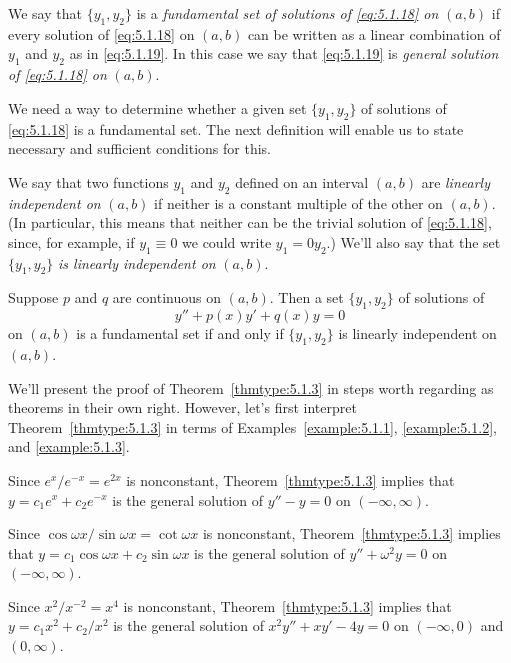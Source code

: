 We say that $\{y_{1},y_{2}\}$ is a {\color{blue}\it fundamental set of solutions of
\eqref{eq:5.1.18} on \/} $(a,b)$ if every solution of \eqref{eq:5.1.18} on $(a,b)$ can be written
as a linear combination of $y_{1}$ and $y_{2}$ as in \eqref{eq:5.1.19}. In this case we say that
\eqref{eq:5.1.19} is {\color{blue}\it general solution of \eqref{eq:5.1.18} on\/} $(a,b)$.


\noindent
We need a way to determine whether a given set $\{y_{1},y_{2}\}$ of solutions of \eqref{eq:5.1.18}
is a fundamental set. The next definition will enable us to state necessary and sufficient
conditions for this.

We say that two functions $y_{1}$ and $y_{2}$ defined on an interval $(a,b)$ are {\color{blue}\it
linearly independent on\/} $(a,b)$ if neither is a constant multiple of the other on $(a,b)$. (In
particular, this means that neither can be the trivial solution of \eqref{eq:5.1.18}, since, for
example, if $y_{1}\equiv0$ we could write $y_{1}=0y_{2}$.) We'll also say that the set
$\{y_{1},y_{2}\}$ {\color{blue}\it is linearly independent on\/} $(a,b)$.

\begin{theorem}
  \color{blue}
  \label{thmtype:5.1.3} Suppose $p$ and $q$ are continuous on $(a,b)$. Then a set $\{y_{1},y_{2}\}$
  of solutions of
  \begin{equation}
    \label{eq:5.1.20}y''+p(x)y'+q(x)y=0
  \end{equation}
  on $(a,b)$ is a fundamental set if and only if $\{y_{1},y_{2}\}$ is linearly independent on
  $(a,b)$.
\end{theorem}

We'll present the proof of Theorem~\ref{thmtype:5.1.3} in steps worth regarding as theorems in their
own right. However, let's first interpret Theorem~\ref{thmtype:5.1.3} in terms of
Examples~\ref{example:5.1.1}, \ref{example:5.1.2}, and \ref{example:5.1.3}.

\begin{example}
  \label{example:5.1.4} \rm \mbox{}
  \newline
  \begin{alist}
    \item %
    Since $e^{x}/e^{-x}=e^{2x}$ is nonconstant, Theorem~\ref{thmtype:5.1.3} implies that
    $y=c_{1}e^{x}+c_{2}e^{-x}$ is the general solution of $y''-y=0$ on $(-\infty,\infty)$.

    \item %
    Since $\cos\omega x/\sin\omega x=\cot\omega x$ is nonconstant, Theorem~\ref{thmtype:5.1.3}
    implies that $y=c_{1}\cos\omega x+c_{2}\sin\omega x$ is the general solution of
    $y''+\omega^{2}y=0$ on $(-\infty,\infty)$.

    \item %
    Since $x^{2}/x^{-2}=x^{4}$ is nonconstant, Theorem~\ref{thmtype:5.1.3} implies that
    $y=c_{1}x^{2}+c_{2}/x^{2}$ is the general solution of $x^{2}y''+xy'-4y=0$ on $(-\infty,0)$ and
    $(0,\infty)$.
  \end{alist}
\end{example}

